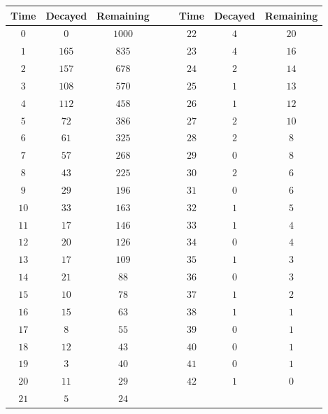\begin{tabular}{cccrrccc} \toprule
Time & Decayed & Remaining &&& Time & Decayed & Remaining \\\midrule
$0$  & $0$     & $1000$    &&& $22$ & $4$     & $20$      \\
$1$  & $165$   & $835$     &&& $23$ & $4$     & $16$      \\
$2$  & $157$   & $678$     &&& $24$ & $2$     & $14$      \\
$3$  & $108$   & $570$     &&& $25$ & $1$     & $13$      \\
$4$  & $112$   & $458$     &&& $26$ & $1$     & $12$      \\
$5$  & $72$    & $386$     &&& $27$ & $2$     & $10$      \\
$6$  & $61$    & $325$     &&& $28$ & $2$     & $8$       \\
$7$  & $57$    & $268$     &&& $29$ & $0$     & $8$       \\
$8$  & $43$    & $225$     &&& $30$ & $2$     & $6$       \\
$9$  & $29$    & $196$     &&& $31$ & $0$     & $6$       \\
$10$ & $33$    & $163$     &&& $32$ & $1$     & $5$       \\
$11$ & $17$    & $146$     &&& $33$ & $1$     & $4$       \\
$12$ & $20$    & $126$     &&& $34$ & $0$     & $4$       \\
$13$ & $17$    & $109$     &&& $35$ & $1$     & $3$       \\
$14$ & $21$    & $88$      &&& $36$ & $0$     & $3$       \\
$15$ & $10$    & $78$      &&& $37$ & $1$     & $2$       \\
$16$ & $15$    & $63$      &&& $38$ & $1$     & $1$       \\
$17$ & $8$     & $55$      &&& $39$ & $0$     & $1$       \\
$18$ & $12$    & $43$      &&& $40$ & $0$     & $1$       \\
$19$ & $3$     & $40$      &&& $41$ & $0$     & $1$       \\
$20$ & $11$    & $29$      &&& $42$ & $1$     & $0$       \\
$21$ & $5$     & $24$ \\\bottomrule
\end{tabular}
